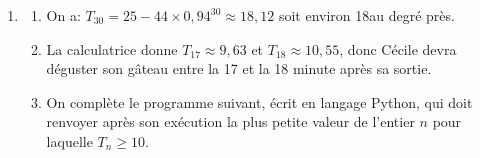 \begin{enumerate}
\begin{enumerate}
$U_{n+1} = 0,94T_n - 23,5 = 0,94\left(T_n - \dfrac{23,5}{0,94} \right) = 0,94\left(T_n - 25 \right)$, soit finalement $T_{n+1} = 0,94U_n$: cette égalité montre que la suite $\left(U_n\right)$ est une suite géométrique de raison 0,94 et de premier terme $U_0 = T_0 - 25 = - 19 - 25 = - 44$.
\item 
On sait que quel soit $n \in \N$, \, $U_n = U_0 \times 0,94^n$ ou 
$U_n = - 44 \times 0,94^n$.

Or $U_n = T_n - 25 \iff T_n = U_n + 25$ ou encore $T_n = - 44 \times 0,94^n + 25$, soit finalement :

\[T_n = 25 - 44 \times 0,94^n, \text{quel que soit }\, n \in \N\]

\item 
Comme $0 < 0,94 < 1$, on sait que $\displaystyle\lim_{n \to + \infty} 0,94^n = 0$, d'où par somme de limites :

\[\displaystyle\lim_{n \to + \infty} T_n = \ell = 25.\]

\end{enumerate}
\item 
	\begin{enumerate}
		\item 
		 

On a: $T_{30} = 25 - 44 \times 0,94^{30} \approx 18,12$ soit environ 18\textcelsius au degré près.
		\item 
		

La calculatrice donne $T_{17} \approx 9,63$ et $T_{18} \approx 10,55$, donc 
Cécile devra déguster son gâteau entre la 17 et la 18 minute après sa sortie.
\item On complète le programme suivant, écrit en langage Python, qui doit renvoyer après son exécution la plus petite valeur de l'entier $n$ pour laquelle $T_n \geqslant 10$.




\begin{center}
\end{center}









	\end{enumerate}
\end{enumerate}
